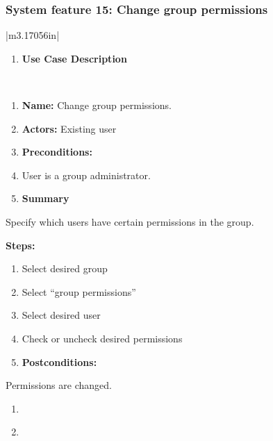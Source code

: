 \documentclass[letterpaper]{article}
\newcommand\textstyleDefaultParagraphFont[1]{#1}
\newcounter{saveenum}
\newcommand\liststyleLFOxiii{%
\renewcommand\theenumi{}
\renewcommand\labelenumi{\theenumi}
\renewcommand\labelitemi{[F0B7?]}
\renewcommand\labelitemii{o}
\renewcommand\labelitemiii{[F0A7?]}
}
\begin{document}
\subsubsection[System feature 15: Change group permissions]{\rmfamily
System feature 15: Change group permissions}
\begin{flushleft}
\tablehead{}
\begin{supertabular}{|m{3.17056in}|}
\hline
\liststyleLFOxiii
\setcounter{saveenum}{\value{enumi}}
\begin{enumerate}
\setcounter{enumi}{\value{saveenum}}
\item \sffamily\bfseries\color{black} Use Case
Description\end{enumerate}
\\\hline
\liststyleLFOxiii
\setcounter{saveenum}{\value{enumi}}
\begin{enumerate}
\setcounter{enumi}{\value{saveenum}}
\item \sffamily\color{black}
\textstyleDefaultParagraphFont{\textbf{Name:
}}\textstyleDefaultParagraphFont{Change
}\textstyleDefaultParagraphFont{group permissions. }\item
\sffamily\color{black} \textstyleDefaultParagraphFont{\textbf{Actors:
}}\textstyleDefaultParagraphFont{Existing user}\item
\sffamily\bfseries\color{black} Preconditions: \item
\sffamily\color{black} \textstyleDefaultParagraphFont{User is a group
administrator.}\item \sffamily\bfseries\color{black}
Summary\end{enumerate}
{\sffamily\color{black} Specify which users have certain permissions in
the group.}

{\sffamily\bfseries\color{black} Steps: }

\liststyleLFOxiii
\setcounter{saveenum}{\value{enumi}}
\begin{enumerate}
\setcounter{enumi}{\value{saveenum}}
\item \sffamily\color{black} \textstyleDefaultParagraphFont{Select
desired group}\item \sffamily\color{black}
\textstyleDefaultParagraphFont{Select {\textquotedblleft}group
permissions{\textquotedblright}}\item \sffamily\color{black}
\textstyleDefaultParagraphFont{Select desired user}\item
\sffamily\color{black} \textstyleDefaultParagraphFont{Check or uncheck
desired permissions}\item \sffamily\bfseries\color{black}
Postconditions: \end{enumerate}
{\sffamily\color{black} Permissions are changed.}

\liststyleLFOxiii
\setcounter{saveenum}{\value{enumi}}
\begin{enumerate}
\setcounter{enumi}{\value{saveenum}}
\item ~
\item ~
\end{enumerate}
\\\hline
\end{supertabular}
\end{flushleft}
\end{document}
